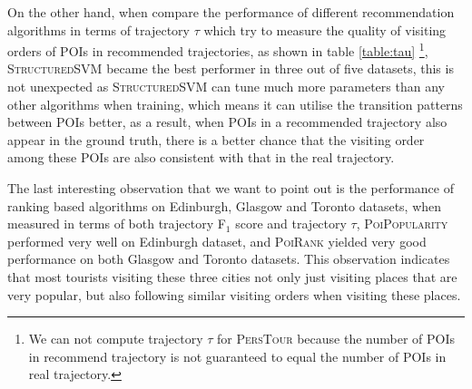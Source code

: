 On the other hand, when compare the performance of different recommendation algorithms in terms of trajectory $\tau$
which try to measure the quality of visiting orders of POIs in recommended trajectories,
as shown in table \ref{table:tau}
\footnote{We can not compute trajectory $\tau$ for \textsc{PersTour} because the number of POIs in recommend trajectory
is not guaranteed to equal the number of POIs in real trajectory.},
\textsc{StructuredSVM} became the best performer in three out of five datasets,
this is not unexpected as \textsc{StructuredSVM} can tune much more parameters than any other algorithms when training,
which means it can utilise the transition patterns between POIs better,
as a result, when POIs in a recommended trajectory also appear in the ground truth,
there is a better chance that the visiting order among these POIs are also consistent with
that in the real trajectory.

%
The last interesting observation that we want to point out is the performance of ranking based algorithms
on Edinburgh, Glasgow and Toronto datasets, when measured in terms of both trajectory F$_1$ score and trajectory
$\tau$, \textsc{PoiPopularity} performed very well on Edinburgh dataset, and \textsc{PoiRank} yielded very good
performance on both Glasgow and Toronto datasets.
This observation indicates that most tourists visiting these three cities not only just visiting
places that are very popular, but also following similar visiting orders when visiting these places.


